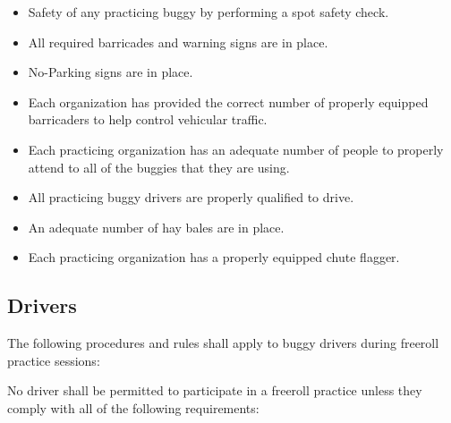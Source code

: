 	\begin{itemize}

		\item Safety of any practicing buggy by performing a spot safety check.

		\item All required barricades and warning signs are in place.

		\item No-Parking signs are in place.

		\item Each organization has provided the correct number of properly equipped barricaders to help control vehicular traffic.

		\item Each practicing organization has an adequate number of people to properly attend to all of the buggies that they are using.

		\item All practicing buggy drivers are properly qualified to drive.

		\item An adequate number of hay bales are in place.

		\item Each practicing organization has a properly equipped chute flagger.

	\end{itemize}

\subsection{Drivers}

	The following procedures and rules shall apply to buggy drivers during freeroll practice sessions:
	\newline

	\noindent No driver shall be permitted to participate in a freeroll practice unless they comply with all of the following requirements:

